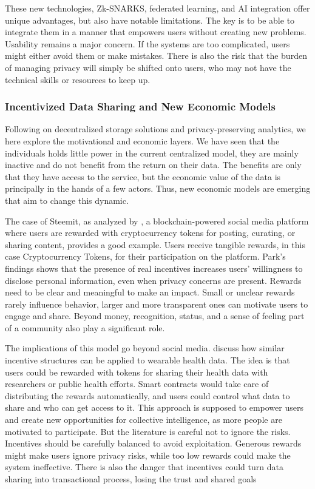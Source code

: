 	These new technologies, Zk-SNARKS, federated learning, and AI integration offer unique advantages, but also have notable limitations. The key is to be able to integrate them in a manner that empowers users without creating new problems. Usability remains a major concern. If the systems are too complicated, users might either avoid them or make mistakes. There is also the risk that the burden of managing privacy will simply be shifted onto users, who may not have the technical skills or resources to keep up.
	\subsubsection{Incentivized Data Sharing and New Economic Models}

	Following on decentralized storage solutions and privacy-preserving analytics, we here explore the motivational and economic layers. We have seen that the individuals holds little power in the current centralized model, they are mainly inactive and do not benefit from the return on their data. The benefits are only that they have access to the service, but the economic value of the data is principally in the hands of a few actors. Thus, new economic models are emerging that aim to change this dynamic.

	The case of Steemit, as analyzed by \cite{Park2023}, a blockchain-powered social media platform where users are rewarded with cryptocurrency tokens for posting, curating, or sharing content, provides a good example.
	Users receive tangible rewards, in this case Cryptocurrency Tokens, for their participation on the platform. Park’s findings shows that the presence of real incentives increases users’ willingness to disclose personal information, even when privacy concerns are present. Rewards need to be clear and meaningful to make an impact. Small or unclear rewards rarely influence behavior, larger and more transparent ones can motivate users to engage and share. Beyond money, recognition, status, and a sense of feeling part of a community also play a significant role.

	The implications of this model go beyond social media. \cite{Boonsong2024} discuss how similar incentive structures can be applied to wearable health data. The idea is that users could be rewarded with tokens for sharing their health data with researchers or public health efforts. Smart contracts would take care of distributing the rewards automatically, and users could control what data to share and who can get access to it. This approach is supposed to empower users and create new opportunities for collective intelligence, as more people are motivated to participate. But the literature is careful not to ignore the risks. Incentives should be carefully balanced to avoid exploitation. Generous rewards might make users ignore privacy risks, while too low rewards could make the system ineffective. There is also the danger that incentives could turn data sharing into transactional process, losing the trust and shared goals

